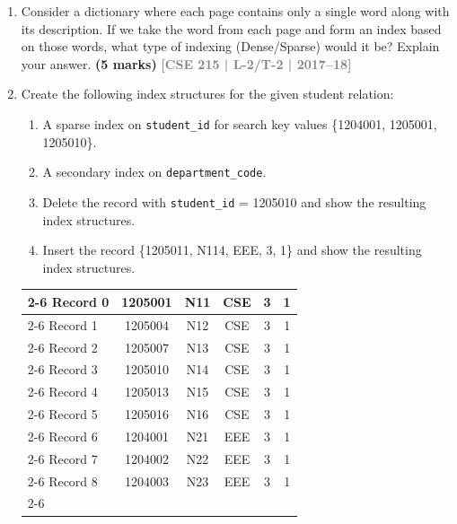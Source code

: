 \documentclass[12pt]{article}
\newcommand{\yr}[1]{\hfill\textcolor{gray}{\small\textbf{[#1]}}}
\newcommand{\mk}[1]{\textcolor{orange!70!black}{\small\textbf{(#1 marks)}}}
\begin{document}
\begin{enumerate}
\begin{center}
\begin{tikzpicture}
    \end{tikzpicture}
\end{center}
\mk{15} \yr{CSE 215 | L-2/T-2 | 2018--19}


\item Consider a dictionary where each page contains only a single word along with its description. If we take the word from each page and form an index based on those words, what type of indexing (Dense/Sparse) would it be? Explain your answer.
\mk{5} \yr{CSE 215 | L-2/T-2 | 2017--18}


\item Create the following index structures for the given student relation:
\begin{enumerate}
  \item A sparse index on \texttt{student\_id} for search key values \{1204001, 1205001, 1205010\}.
  \item A secondary index on \texttt{department\_code}.
  \item Delete the record with \texttt{student\_id} = 1205010 and show the resulting index structures.
  \item Insert the record \{1205011, N114, EEE, 3, 1\} and show the resulting index structures.
\end{enumerate}

\begin{center}
  \renewcommand{\arraystretch}{1.3} %
    \begin{tabular}{l |c|c|c|c|c|}
        \cline{2-6}
        Record 0 & 1205001 & N11 & CSE & 3 & 1 \\
        \cline{2-6}
        Record 1 & 1205004 & N12 & CSE & 3 & 1 \\
        \cline{2-6}
        Record 2 & 1205007 & N13 & CSE & 3 & 1 \\
        \cline{2-6}
        Record 3 & 1205010 & N14 & CSE & 3 & 1 \\
        \cline{2-6}
        Record 4 & 1205013 & N15 & CSE & 3 & 1 \\
        \cline{2-6}
        Record 5 & 1205016 & N16 & CSE & 3 & 1 \\
        \cline{2-6}
        Record 6 & 1204001 & N21 & EEE & 3 & 1 \\
        \cline{2-6}
        Record 7 & 1204002 & N22 & EEE & 3 & 1 \\
        \cline{2-6}
        Record 8 & 1204003 & N23 & EEE & 3 & 1 \\
        \cline{2-6}
    \end{tabular}
    

\end{center}
\end{enumerate}
\end{document}
